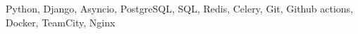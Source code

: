 \documentclass[a4paper, 12pt]{article}
\begin{document}
Python, Django, Asyncio, PostgreSQL, SQL, Redis, Celery, Git, Github actions, Docker, TeamCity, Nginx
\end{document}
